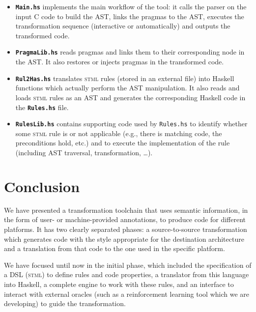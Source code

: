 \documentclass[svgnames,usenames,preprint,nocopyrightspace]{sigplanconf}
\newcommand{\stml}{\textsc{stml}\xspace}
\begin{document}
\begin{itemize}

\item \texttt{\textbf{Main.hs}} 
implements the main  workflow of the tool: it calls the parser on the input C
  code to build the AST, links the pragmas to the AST, executes the 
  transformation sequence (interactive or automatically)
and outputs the transformed code.

\item \texttt{\textbf{PragmaLib.hs}} reads pragmas and links them to
  their corresponding node in the AST.  It also restores or injects
  pragmas in the transformed code.


\item \texttt{\textbf{Rul2Has.hs}} translates \stml rules (stored in
  an external file) into Haskell functions which actually perform the
  AST manipulation.  It also reads and loads \stml rules as an AST and
  generates the corresponding Haskell code in the
  \texttt{\textbf{Rules.hs}} file.



\item \texttt{\textbf{RulesLib.hs}} contains supporting code used by
  \texttt{Rules.hs} to identify whether some \stml rule is or not
  applicable (e.g., there is matching code, the preconditions hold,
  etc.) and to execute the implementation of the rule (including AST
  traversal, transformation, \ldots).
\end{itemize}









\section{Conclusion}
\label{sec:conclusions}

We have presented a transformation toolchain that uses semantic
information, in the form of user- or machine-provided annotations, to
produce code for different platforms.  It has two clearly separated
phases: a source-to-source transformation which generates code with
the style appropriate for the destination architecture and a
translation from that code to the one used in the specific platform.

We have focused until now in the initial phase, which included the
specification of a DSL (\stml) to define rules and code properties, a
translator from this language into Haskell, a complete engine to work with
these rules, and an interface to interact with external oracles (such
as a reinforcement learning tool which we are developing) to guide the
transformation.
\end{document}
